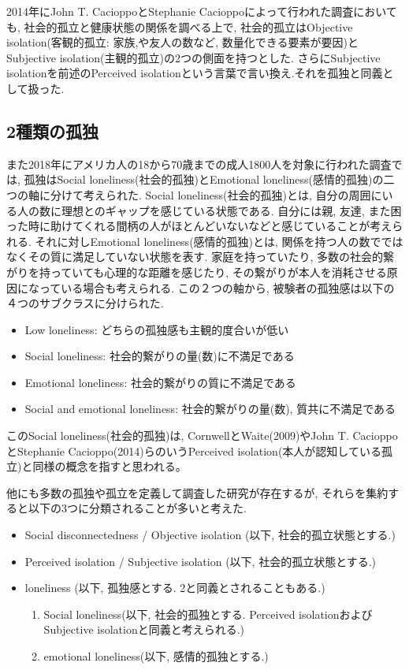 \documentclass[a4paper,dvipdfmx]{hisken}
\begin{document}
2014年にJohn T. CacioppoとStephanie Cacioppoによって行われた調査においても, 社会的孤立と健康状態の関係を調べる上で, 社会的孤立はObjective isolation(客観的孤立: 家族,や友人の数など, 数量化できる要素が要因)とSubjective isolation(主観的孤立)の2つの側面を持つとした{}\cite{tex2}. さらにSubjective isolationを前述のPerceived isolationという言葉で言い換え.それを孤独と同義として扱った.

\subsection{2種類の孤独}

また2018年にアメリカ人の18から70歳までの成人1800人を対象に行われた調査では, 孤独はSocial loneliness(社会的孤独)とEmotional loneliness(感情的孤独)の二つの軸に分けて考えられた{}\cite{tex3}.
Social loneliness(社会的孤独)とは, 自分の周囲にいる人の数に理想とのギャップを感じている状態である. 自分には親, 友達, また困った時に助けてくれる間柄の人がほとんどいないなどと感じていることが考えられる. それに対しEmotional loneliness(感情的孤独)とは, 関係を持つ人の数でではなくその質に満足していない状態を表す. 家庭を持っていたり, 多数の社会的繋がりを持っていても心理的な距離を感じたり, その繋がりが本人を消耗させる原因になっている場合も考えられる. 
この２つの軸から, 被験者の孤独感は以下の４つのサブクラスに分けられた. 
\begin{itemize}
\item Low loneliness: どちらの孤独感も主観的度合いが低い
\item Social loneliness: 社会的繋がりの量(数)に不満足である
\item Emotional loneliness:  社会的繋がりの質に不満足である
\item Social and emotional loneliness: 社会的繋がりの量(数), 質共に不満足である
\end{itemize}


このSocial loneliness(社会的孤独)は, CornwellとWaite(2009)やJohn T. CacioppoとStephanie Cacioppo(2014)らのいうPerceived isolation(本人が認知している孤立)と同様の概念を指すと思われる。

他にも多数の孤独や孤立を定義して調査した研究が存在するが, それらを集約すると以下の3つに分類されることが多いと考えた.
\begin{itemize}
\item Social disconnectedness / Objective isolation (以下, 社会的孤立状態とする.)
\item Perceived isolation / Subjective isolation (以下, 社会的孤立状態とする.)
\item loneliness (以下, 孤独感とする. 2と同義とされることもある.)
\begin{enumerate}
\item Social loneliness(以下, 社会的孤独とする. Perceived isolationおよびSubjective isolationと同義と考えられる.)
\item emotional loneliness(以下, 感情的孤独とする.)
\end{enumerate}
\end{itemize}
\end{document}
